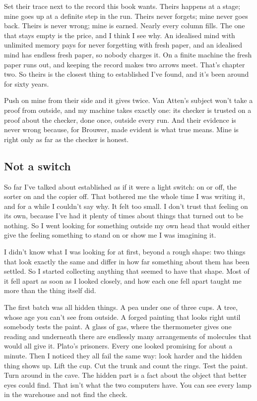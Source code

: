 \documentclass[11pt,twoside]{article}
\theoremstyle{thielethm}
\theoremstyle{thieledef}
\theoremstyle{thieledef}
\theoremstyle{thieledef}
\theoremstyle{thielethm}
\theoremstyle{thieleobs}
\theoremstyle{thielethm}
\begin{document}
Set their trace next to the record this book wants. Theirs happens at a stage; mine goes up at a definite step in the run. Theirs never forgets; mine never goes back. Theirs is never wrong; mine is earned. Nearly every column fills. The one that stays empty is the price, and I think I see why. An idealised mind with unlimited memory pays for never forgetting with fresh paper, and an idealised mind has endless fresh paper, so nobody charges it. On a finite machine the fresh paper runs out, and keeping the record makes two arrows meet. That's chapter two. So theirs is the closest thing to established I've found, and it's been around for sixty years.

Push on mine from their side and it gives twice. Van Atten's subject won't take a proof from outside, and my machine takes exactly one: its checker is trusted on a proof about the checker, done once, outside every run. And their evidence is never wrong because, for Brouwer, made evident is what true means. Mine is right only as far as the checker is honest.

\subsection{Not a switch}

So far I've talked about established as if it were a light switch: on or off, the sorter on and the copier off. That bothered me the whole time I was writing it, and for a while I couldn't say why. It felt too small. I don't trust that feeling on its own, because I've had it plenty of times about things that turned out to be nothing. So I went looking for something outside my own head that would either give the feeling something to stand on or show me I was imagining it.

I didn't know what I was looking for at first, beyond a rough shape: two things that look exactly the same and differ in how far something about them has been settled. So I started collecting anything that seemed to have that shape. Most of it fell apart as soon as I looked closely, and how each one fell apart taught me more than the thing itself did.

The first batch was all hidden things. A pea under one of three cups. A tree, whose age you can't see from outside. A forged painting that looks right until somebody tests the paint. A glass of gas, where the thermometer gives one reading and underneath there are endlessly many arrangements of molecules that would all give it. Plato's prisoners. Every one looked promising for about a minute. Then I noticed they all fail the same way: look harder and the hidden thing shows up. Lift the cup. Cut the trunk and count the rings. Test the paint. Turn around in the cave. The hidden part is a fact about the object that better eyes could find. That isn't what the two computers have. You can see every lamp in the warehouse and not find the check.
\end{document}
